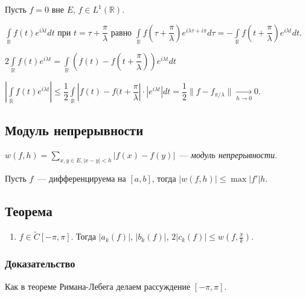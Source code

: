\documentclass{article}
\begin{document}
            Пусть $f = 0$ вне $E$, $f \in L^1 (\mathbb{R})$.
            
            $\int\limits_{\mathbb{R}} f(t) e^{i \lambda t} dt$ при $t = \tau + \dfrac{\pi}{\lambda}$ равно $\int\limits_{\mathbb{R}} f \left( \tau + \dfrac{\pi}{\lambda} \right) e^{i \lambda \tau + i \pi} d \tau = - \int\limits_{\mathbb{R}} f \left( t + \dfrac{\pi}{\lambda} \right) e^{i \lambda t} dt$.
            
            $2 \int\limits_{\mathbb{R}} f(t) e^{i \lambda t} = \int\limits_{\mathbb{R}} \left( f(t) - f(t + \dfrac{\pi}{\lambda}) \right) e^{i \lambda t} dt$
            
            $\left| \int\limits_{\mathbb{R}} f(t) e^{i \lambda t} \right| \leqslant \dfrac{1}{2} \int\limits_{\mathbb{R}} \left| f(t) - f(t + \dfrac{\pi}{\lambda} \right| \cdot \left| e^{i \lambda t} \right| dt = \dfrac{1}{2} \| f - f_{\pi / \lambda} \| \xrightarrow[h \rightarrow 0]{} 0$.
        
    \subsection{Модуль непрерывности}
    
        $w(f, h) = \sum\limits_{x, y \in E, |x - y| < h} | f(x) - f(y) |$~--- \textit{модуль непрерывности}.
        
    Пусть $f$~--- дифференцируема на $[a, b]$, тогда $| w(f, h)| \leqslant \max |f'| h$.
    
    \subsection{Теорема}
    
        \begin{enumerate}
        
            \item $f \in \widetilde{C} [-\pi, \pi]$. Тогда $|a_k(f)|$, $|b_k(f)|$, $2|c_k(f)| \leqslant w(f, \frac{\pi}{k})$.
            
        \end{enumerate}
        
        \subsubsection{Доказательство}
        
            Как в теореме Римана-Лебега делаем рассуждение $[-\pi, \pi]$.
            
\end{document}
